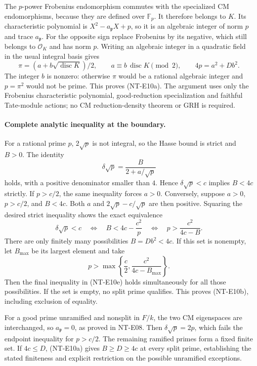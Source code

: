 The $p$-power Frobenius endomorphism commutes with the specialized
CM endomorphisms, because they are defined over $\mathbb F_p$.
It therefore belongs to $K$. Its characteristic polynomial is
$X^2-a_{\mathfrak p}X+p$, so it is an algebraic integer of norm
$p$ and trace $a_{\mathfrak p}$. For the opposite sign replace
Frobenius by its negative, which still belongs to $\mathcal O_K$
and has norm $p$. Writing an algebraic integer in a quadratic
field in the usual integral basis gives
\[
 \pi=(a+b\sqrt{\operatorname{disc}K})/2,\qquad
 a\equiv b\,\operatorname{disc}K\pmod2,\qquad
 4p=a^2+Db^2.
                                                               \tag{NT-E10c}
\]
The integer $b$ is nonzero: otherwise $\pi$ would be a rational
algebraic integer and $p=\pi^2$ would not be prime.
This proves (NT-E10a). The argument uses only the Frobenius
characteristic polynomial, good-reduction specialization and
faithful Tate-module actions; no CM reduction-density theorem
or GRH is required.

\paragraph{Complete analytic inequality at the boundary.}
For a rational prime $p$, $2\sqrt p$ is not integral, so the Hasse
bound is strict and $B>0$. The identity
\[
 \delta\sqrt p=\frac{B}{2+a/\sqrt p}                    \tag{NT-E10d}
\]
holds, with a positive denominator smaller than $4$. Hence
$\delta\sqrt p<c$ implies $B<4c$ strictly.
If $p>c/2$, the same inequality forces $a>0$.
Conversely, suppose $a>0$, $p>c/2$, and $B<4c$.
Both $a$ and $2\sqrt p-c/\sqrt p$ are then positive.
Squaring the desired strict inequality shows the exact equivalence
\[
 \delta\sqrt p<c
 \quad\Longleftrightarrow\quad
 B<4c-\frac{c^2}{p}
 \quad\Longleftrightarrow\quad
 p>\frac{c^2}{4c-B}.                                   \tag{NT-E10e}
\]
There are only finitely many possibilities $B=Db^2<4c$.
If this set is nonempty, let $B_{\max}$ be its largest element and
take
\[
 p>\max\left\{\frac c2,\frac{c^2}{4c-B_{\max}}\right\}.
                                                               \tag{NT-E10f}
\]
Then the final inequality in (NT-E10e) holds simultaneously for
all those possibilities. If the set is empty, no split prime
qualifies. This proves (NT-E10b), including exclusion of equality.

For a good prime unramified and nonsplit in $F/k$, the two CM
eigenspaces are interchanged, so $a_{\mathfrak p}=0$, as proved in
NT-E08. Then $\delta\sqrt p=2p$, which fails the endpoint
inequality for $p>c/2$. The remaining ramified primes form a
fixed finite set. If $4c\le D$, (NT-E10a) gives $B\ge D\ge4c$
at every split prime, establishing the stated finiteness and
explicit restriction on the possible unramified exceptions.

